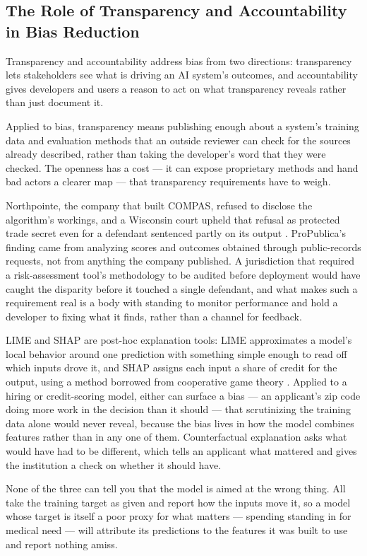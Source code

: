 \subsection{The Role of Transparency and Accountability in Bias Reduction}
\label{sec:6.1.2}
Transparency and accountability address bias from two directions: transparency lets stakeholders see what is driving an AI system's outcomes, and accountability gives developers and users a reason to act on what transparency reveals rather than just document it.

Applied to bias, transparency means publishing enough about a system's training data and evaluation methods that an outside reviewer can check for the sources already described, rather than taking the developer's word that they were checked. The openness has a cost — it can expose proprietary methods and hand bad actors a clearer map — that transparency requirements have to weigh.

Northpointe, the company that built COMPAS, refused to disclose the algorithm's workings, and a Wisconsin court upheld that refusal as protected trade secret even for a defendant sentenced partly on its output \autocite{loomis2016compas}. ProPublica's finding came from analyzing scores and outcomes obtained through public-records requests, not from anything the company published. A jurisdiction that required a risk-assessment tool's methodology to be audited before deployment would have caught the disparity before it touched a single defendant, and what makes such a requirement real is a body with standing to monitor performance and hold a developer to fixing what it finds, rather than a channel for feedback.

LIME and SHAP are post-hoc explanation tools: LIME approximates a model's local behavior around one prediction with something simple enough to read off which inputs drove it, and SHAP assigns each input a share of credit for the output, using a method borrowed from cooperative game theory \autocite{ribeiro2016why,lundberg2017unified}. Applied to a hiring or credit-scoring model, either can surface a bias — an applicant's zip code doing more work in the decision than it should — that scrutinizing the training data alone would never reveal, because the bias lives in how the model combines features rather than in any one of them. Counterfactual explanation asks what would have had to be different, which tells an applicant what mattered and gives the institution a check on whether it should have.

None of the three can tell you that the model is aimed at the wrong thing. All take the training target as given and report how the inputs move it, so a model whose target is itself a poor proxy for what matters — spending standing in for medical need — will attribute its predictions to the features it was built to use and report nothing amiss.
